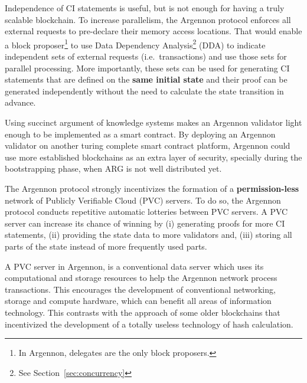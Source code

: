 Independence of CI statements is useful, but is not enough for having a truly scalable blockchain. To increase
parallelism, the Argennon protocol enforces all external requests to pre-declare their memory access locations. That
would enable a block proposer\footnote{In Argennon, delegates are the only block proposers.} to use Data Dependency
Analysis\footnote{See Section~\ref{sec:concurrency}} (DDA) to indicate independent sets of external requests (i.e.\
transactions) and use those sets for parallel processing. More importantly, these sets can be used for generating CI
statements that are defined on the \textbf{same initial state} and their proof can be generated independently without
the need to calculate the state transition in advance.

Using succinct argument of knowledge systems makes an Argennon validator light enough to be implemented as a smart
contract. By deploying an Argennon validator on another turing complete smart contract platform, Argennon could use
more established blockchains as an extra layer of security, specially
during the bootstrapping phase, when ARG is not well distributed yet.

The Argennon protocol strongly incentivizes the formation of a \textbf{permission-less} network of Publicly Verifiable
Cloud (PVC) servers. To do so, the Argennon protocol conducts repetitive automatic lotteries between PVC servers.
A PVC server can increase its chance of winning by (i) generating proofs for more CI statements, (ii) providing the
state data to more validators and, (iii) storing all parts of the state instead of more frequently used parts.

A PVC server in Argennon, is a conventional data server which uses its computational and
storage resources to help the Argennon network process transactions. This encourages the development
of conventional networking, storage and compute hardware, which can benefit all areas of information technology.
This contrasts with the approach of some older blockchains that incentivized the development of a totally
useless technology of hash calculation.
